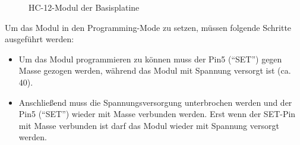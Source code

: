 \begin{figure}[H]
    \centering
    \qquad
    \qquad
    \caption[HC-12-Modul der Basisplatine]{HC-12-Modul der \gls{Basisplatine}}
    \label{fig:basisplatine-hc12}
\end{figure}

Um das Modul in den Programming-Mode zu setzen, müssen folgende Schritte ausgeführt werden:
\begin{itemize}
    \item Um das Modul programmieren zu können muss der Pin5 (\enquote{SET}) gegen Masse gezogen werden, während das Modul mit Spannung versorgt ist (ca. \unit{40}{\milli\second}).
    \item Anschließend muss die Spannungsversorgung unterbrochen werden und der Pin5 (\enquote{SET}) wieder mit Masse verbunden werden. Erst wenn der SET-Pin mit Masse verbunden ist darf das Modul wieder mit Spannung versorgt werden.
\end{itemize}

